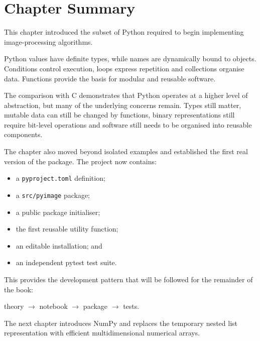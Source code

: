 \section{Chapter Summary}
\label{sec:ch03-summary}

This chapter introduced the subset of Python required to begin
implementing image-processing algorithms.

Python values have definite types, while names are dynamically bound
to objects. Conditions control execution, loops express repetition
and collections organise data. Functions provide the basis for
modular and reusable software.

The comparison with C demonstrates that Python operates at a higher
level of abstraction, but many of the underlying concerns remain.
Types still matter, mutable data can still be changed by functions,
binary representations still require bit-level operations and
software still needs to be organised into reusable components.

The chapter also moved beyond isolated examples and established the
first real version of the \pyimage{} package. The project now
contains:

\begin{itemize}
    \item a \texttt{pyproject.toml} definition;
    \item a \texttt{src/pyimage} package;
    \item a public package initialiser;
    \item the first reusable utility function;
    \item an editable installation; and
    \item an independent pytest test suite.
\end{itemize}

This provides the development pattern that will be followed for the
remainder of the book:

\begin{center}
theory
$\rightarrow$
notebook
$\rightarrow$
package
$\rightarrow$
tests.
\end{center}

The next chapter introduces NumPy and replaces the temporary nested
list representation with efficient multidimensional numerical arrays.